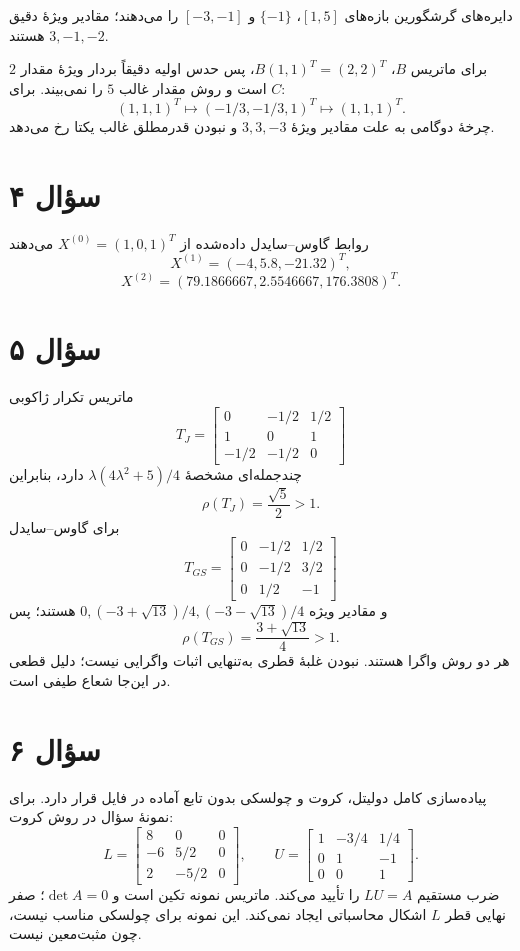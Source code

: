 \documentclass[12pt]{article}
\begin{document}
دایره‌های گرشگورین بازه‌های \([1,5]\)، \(\{-1\}\) و \([-3,-1]\) را می‌دهند؛ مقادیر ویژهٔ دقیق \(3,-1,-2\) هستند.

برای ماتریس \(B\)، \(B(1,1)^T=(2,2)^T\)، پس حدس اولیه دقیقاً بردار ویژهٔ مقدار \(2\) است و روش مقدار غالب \(5\) را نمی‌بیند. برای \(C\):
\[
 (1,1,1)^T\longmapsto(-1/3,-1/3,1)^T\longmapsto(1,1,1)^T.
\]
چرخهٔ دوگامی به علت مقادیر ویژهٔ \(3,3,-3\) و نبودن قدرمطلق غالب یکتا رخ می‌دهد.

\section*{سؤال ۴}
روابط گاوس--سایدل داده‌شده از \(X^{(0)}=(1,0,1)^T\) می‌دهند
\[
 \boxed{X^{(1)}=(-4,5.8,-21.32)^T},
\]
\[
 \boxed{X^{(2)}=(79.1866667,2.5546667,176.3808)^T}.
\]

\clearpage
\section*{سؤال ۵}
ماتریس تکرار ژاکوبی
\[
 T_J=\begin{bmatrix}0&-1/2&1/2\\1&0&1\\-1/2&-1/2&0\end{bmatrix}
\]
چندجمله‌ای مشخصهٔ \(\lambda(4\lambda^2+5)/4\) دارد، بنابراین
\[
 \rho(T_J)=\frac{\sqrt5}{2}>1.
\]
برای گاوس--سایدل
\[
 T_{GS}=\begin{bmatrix}0&-1/2&1/2\\0&-1/2&3/2\\0&1/2&-1\end{bmatrix}
\]
و مقادیر ویژه \(0,(-3+\sqrt{13})/4,(-3-\sqrt{13})/4\) هستند؛ پس
\[
 \rho(T_{GS})=\frac{3+\sqrt{13}}4>1.
\]
هر دو روش واگرا هستند. نبودن غلبهٔ قطری به‌تنهایی اثبات واگرایی نیست؛ دلیل قطعی در این‌جا شعاع طیفی است.

\section*{سؤال ۶}
پیاده‌سازی کامل دولیتل، کروت و چولسکی بدون تابع آماده در فایل
قرار دارد. برای نمونهٔ سؤال در روش کروت:
\[
 L=\begin{bmatrix}8&0&0\\-6&5/2&0\\2&-5/2&0\end{bmatrix},
 \qquad
 U=\begin{bmatrix}1&-3/4&1/4\\0&1&-1\\0&0&1\end{bmatrix}.
\]
ضرب مستقیم \(LU=A\) را تأیید می‌کند. ماتریس نمونه تکین است و \(\det A=0\)؛ صفر نهایی قطر \(L\) اشکال محاسباتی ایجاد نمی‌کند. این نمونه برای چولسکی مناسب نیست، چون مثبت‌معین نیست.
\end{document}
